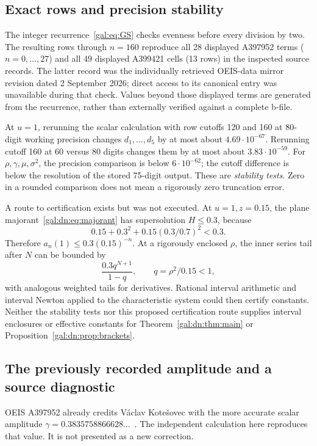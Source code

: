 \documentclass[11pt,letterpaper]{article}
\numberwithin{equation}{section}
\theoremstyle{definition}\newtheorem{definition}[theorem]{Definition}
\theoremstyle{remark}\newtheorem{remark}[theorem]{Remark}
\begin{document}
\subsection{Exact rows and precision stability}
The integer recurrence~\eqref{gal:eq:GS} checks evenness before every division by two. The resulting rows through $n=160$ reproduce all 28 displayed A397952 terms ($n=0,\ldots,27$) and all 49 displayed A399421 cells (13 rows) in the inspected source records. The latter record was the individually retrieved OEIS-data mirror revision dated 2 September 2026; direct access to its canonical entry was unavailable during that check. Values beyond those displayed terms are generated from the recurrence, rather than externally verified against a complete b-file.

At $u=1$, rerunning the scalar calculation with row cutoffs 120 and 160 at 80-digit working precision changes $d_1,\ldots,d_5$ by at most about $4.69\cdot10^{-67}$. Rerunning cutoff 160 at 60 versus 80 digits changes them by at most about $3.83\cdot10^{-59}$. For $\rho,\gamma,\mu,\sigma^2$, the precision comparison is below $6\cdot10^{-62}$; the cutoff difference is below the resolution of the stored 75-digit output. These are \emph{stability tests}. Zero in a rounded comparison does not mean a rigorously zero truncation error.

A route to certification exists but was not executed. At $u=1,z=0.15$, the plane majorant~\eqref{gal:dn:eq:majorant} has supersolution $H\leq0.3$, because
\[
 0.15+0.3^2+0.15(0.3/0.7)^2<0.3.
\]
Therefore $a_n(1)\leq0.3(0.15)^{-n}$. At a rigorously enclosed $\rho$, the inner series tail after $N$ can be bounded by
\[
 \frac{0.3q^{N+1}}{1-q},\qquad q=\rho^2/0.15<1,
\]
with analogous weighted tails for derivatives. Rational interval arithmetic and interval Newton applied to the characteristic system could then certify constants. Neither the stability tests nor this proposed certification route supplies interval enclosures or effective constants for Theorem~\ref{gal:dn:thm:main} or Proposition~\ref{gal:dn:prop:brackets}.

\subsection{The previously recorded amplitude and a source diagnostic}\label{gal:dn:sec:diagnostic}
OEIS A397952 already credits V\'aclav Kote\v{s}ovec with the more accurate scalar amplitude $\gamma=0.3835758866628\ldots$~\cite{oeis397952}. The independent calculation here reproduces that value. It is not presented as a new correction.
\end{document}

